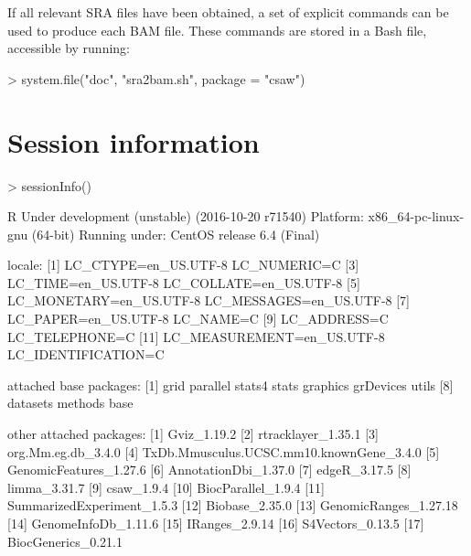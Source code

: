\documentclass[12pt]{report}
\renewenvironment{Schunk}{\vspace{0pt}}{\vspace{0pt}}
\begin{document}
If all relevant SRA files have been obtained, a set of explicit commands can be used to produce each BAM file.
These commands are stored in a Bash file, accessible by running:

\begin{Schunk}
\begin{Sinput}
> system.file("doc", "sra2bam.sh", package = "csaw")
\end{Sinput}
\end{Schunk}

\section{Session information}
\begin{Schunk}
\begin{Sinput}
> sessionInfo()
\end{Sinput}
\begin{Soutput}
R Under development (unstable) (2016-10-20 r71540)
Platform: x86_64-pc-linux-gnu (64-bit)
Running under: CentOS release 6.4 (Final)

locale:
 [1] LC_CTYPE=en_US.UTF-8       LC_NUMERIC=C              
 [3] LC_TIME=en_US.UTF-8        LC_COLLATE=en_US.UTF-8    
 [5] LC_MONETARY=en_US.UTF-8    LC_MESSAGES=en_US.UTF-8   
 [7] LC_PAPER=en_US.UTF-8       LC_NAME=C                 
 [9] LC_ADDRESS=C               LC_TELEPHONE=C            
[11] LC_MEASUREMENT=en_US.UTF-8 LC_IDENTIFICATION=C       

attached base packages:
 [1] grid      parallel  stats4    stats     graphics  grDevices utils    
 [8] datasets  methods   base     

other attached packages:
 [1] Gviz_1.19.2                             
 [2] rtracklayer_1.35.1                      
 [3] org.Mm.eg.db_3.4.0                      
 [4] TxDb.Mmusculus.UCSC.mm10.knownGene_3.4.0
 [5] GenomicFeatures_1.27.6                  
 [6] AnnotationDbi_1.37.0                    
 [7] edgeR_3.17.5                            
 [8] limma_3.31.7                            
 [9] csaw_1.9.4                              
[10] BiocParallel_1.9.4                      
[11] SummarizedExperiment_1.5.3              
[12] Biobase_2.35.0                          
[13] GenomicRanges_1.27.18                   
[14] GenomeInfoDb_1.11.6                     
[15] IRanges_2.9.14                          
[16] S4Vectors_0.13.5                        
[17] BiocGenerics_0.21.1                     


\end{Soutput}
\end{Schunk}
\end{document}
